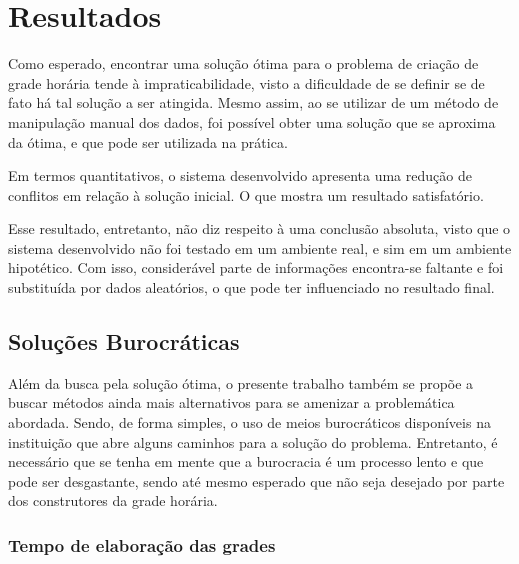 \chapter{Resultados} \label{chap:resultados}


Como esperado, encontrar uma solução ótima para o problema de criação de grade horária tende à impraticabilidade, visto a dificuldade de se definir se de fato há tal solução a ser atingida. Mesmo assim, ao se utilizar de um método de manipulação manual dos dados, foi possível obter uma solução que se aproxima da ótima, e que pode ser utilizada na prática.

Em termos quantitativos, o sistema desenvolvido apresenta uma redução de conflitos em relação à solução inicial. O que mostra um resultado satisfatório.


Esse resultado, entretanto, não diz respeito à uma conclusão absoluta, visto que o sistema desenvolvido não foi testado em um ambiente real, e sim em um ambiente hipotético. Com isso, considerável parte de informações encontra-se faltante e foi substituída por dados aleatórios, o que pode ter influenciado no resultado final.

\section{Soluções Burocráticas} %

Além da busca pela solução ótima, o presente trabalho também se propõe a buscar métodos ainda mais alternativos para se amenizar a problemática abordada. Sendo, de forma simples, o uso de meios burocráticos disponíveis na instituição que abre alguns caminhos para a solução do problema. Entretanto, é necessário que se tenha em mente que a burocracia é um processo lento e que pode ser desgastante, sendo até mesmo esperado que não seja desejado por parte dos construtores da grade horária.

\subsection{Tempo de elaboração das grades} %

